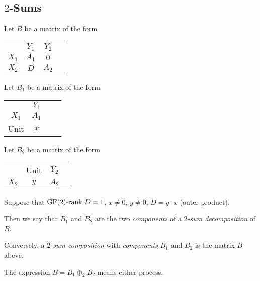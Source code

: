 \subsection{$2$-Sums}

\begin{definition}
  \label{def:code_2_sum_of_matrices}
  Let $B$ be a matrix of the form
  \begin{tabular}{cccc}
                                 & $Y_{1}$                      & $Y_{2}$                      \\ \cline{2-3}
    \multicolumn{1}{c|}{$X_{1}$} & \multicolumn{1}{c|}{$A_{1}$} & \multicolumn{1}{c|}{    $0$} \\ \cline{2-3}
    \multicolumn{1}{c|}{$X_{2}$} & \multicolumn{1}{c|}{    $D$} & \multicolumn{1}{c|}{$A_{2}$} \\ \cline{2-3}
  \end{tabular}
  Let $B_{1}$ be a matrix of the form
  \begin{tabular}{cccc}
                                 & $Y_{1}$ \\ \cline{2-3}
    \multicolumn{1}{c|}{$X_{1}$} & \multicolumn{1}{c|}{$A_{1}$} \\ \cline{2-3}
    \multicolumn{1}{c|}{   Unit} & \multicolumn{1}{c|}{    $x$} \\ \cline{2-3}
  \end{tabular}
  Let $B_{2}$ be a matrix of the form
  \begin{tabular}{cccc}
                                 &                     Unit & $Y_{2}$ \\ \cline{2-3}
    \multicolumn{1}{c|}{$X_{2}$} & \multicolumn{1}{c|}{$y$} & \multicolumn{1}{c|}{$A_{2}$} \\ \cline{2-3}
  \end{tabular}
  Suppose that $\mathrm{GF}(2) \text{-rank } D = 1$, $x \neq 0$, $y \neq 0$, $D = y \cdot x$ (outer product).

  Then we say that $B_{1}$ and $B_{2}$ are the two \emph{components} of a \emph{$2$-sum decomposition} of $B$.

  Conversely, a \emph{$2$-sum composition} with \emph{components} $B_{1}$ and $B_{2}$ is the matrix $B$ above.

  The expression $B = B_{1} \oplus_{2} B_{2}$ means either process.
\end{definition}

